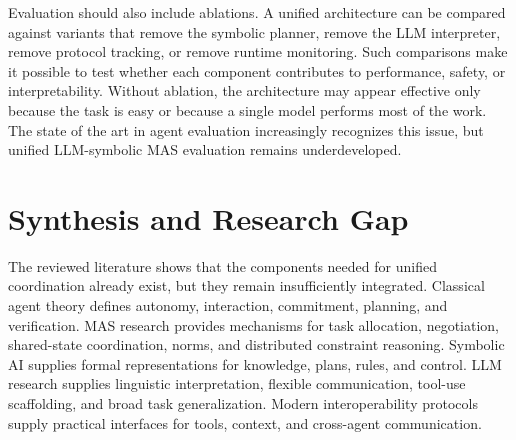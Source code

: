 Evaluation should also include ablations. A unified architecture can be compared against variants that remove the symbolic planner, remove the LLM interpreter, remove protocol tracking, or remove runtime monitoring. Such comparisons make it possible to test whether each component contributes to performance, safety, or interpretability. Without ablation, the architecture may appear effective only because the task is easy or because a single model performs most of the work. The state of the art in agent evaluation increasingly recognizes this issue, but unified LLM-symbolic MAS evaluation remains underdeveloped.

\section{Synthesis and Research Gap}

The reviewed literature shows that the components needed for unified coordination already exist, but they remain insufficiently integrated. Classical agent theory defines autonomy, interaction, commitment, planning, and verification. MAS research provides mechanisms for task allocation, negotiation, shared-state coordination, norms, and distributed constraint reasoning. Symbolic AI supplies formal representations for knowledge, plans, rules, and control. LLM research supplies linguistic interpretation, flexible communication, tool-use scaffolding, and broad task generalization. Modern interoperability protocols supply practical interfaces for tools, context, and cross-agent communication.

